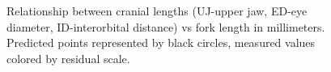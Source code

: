 \documentclass[12pt]{article}\usepackage[]{graphicx}\usepackage[]{color}
\begin{document}
\begin{figure}[htb]

 \hfill{}

\caption{Relationship between cranial lengths (UJ-upper jaw, ED-eye diameter, ID-interorbital distance) vs fork length in millimeters. Predicted points represented by black circles, measured values colored by residual scale.}\label{fig:figure2}
\end{figure}
\end{document}
